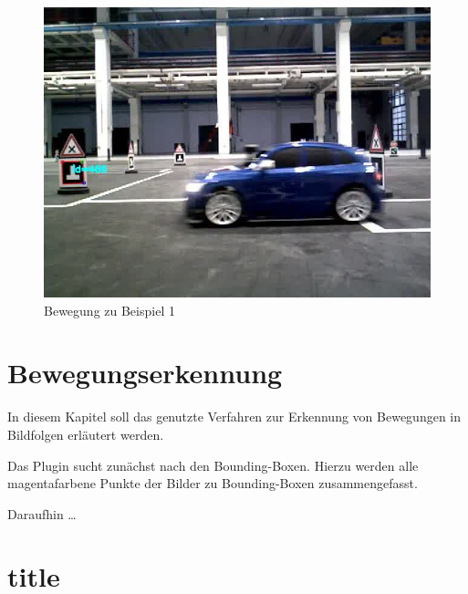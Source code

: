 \begin{figure}[h]
	\centering
	\includegraphics[scale=0.5]{./Abbildungen/bsp2.jpg}
	\caption{Bewegung zu Beispiel 1}
	\label{img:bsp2}
\end{figure}

\chapter{Bewegungserkennung}

In diesem Kapitel soll das genutzte Verfahren zur Erkennung von Bewegungen in Bildfolgen erläutert werden.

Das Plugin sucht zunächst nach den Bounding-Boxen. Hierzu werden alle magentafarbene Punkte der Bilder zu Bounding-Boxen zusammengefasst.

Daraufhin \dots

\chapter{title}